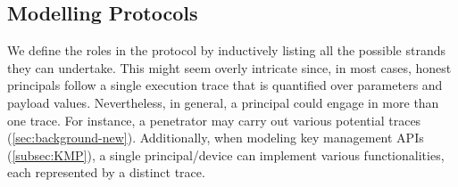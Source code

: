 \subsection{Modelling Protocols}
\label{sec:specification}

We define the roles in the protocol by inductively listing all the possible strands they can undertake.
This might seem overly intricate since, in most cases, honest principals follow a single execution trace that is quantified over parameters and payload values.
Nevertheless, in general, a principal could engage in more than one trace.
For instance, a penetrator may carry out various potential traces (\cref{sec:background-new}).
Additionally, when modeling key management APIs (\cref{subsec:KMP}), a single principal/device can implement various functionalities, each represented by a distinct trace.

